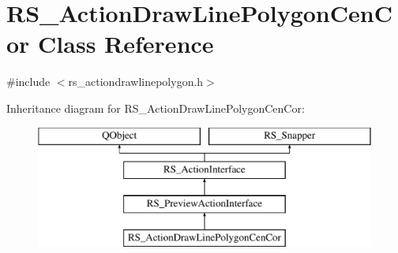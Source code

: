 \hypertarget{classRS__ActionDrawLinePolygonCenCor}{\section{R\-S\-\_\-\-Action\-Draw\-Line\-Polygon\-Cen\-Cor Class Reference}
\label{classRS__ActionDrawLinePolygonCenCor}
}


{\ttfamily \#include $<$rs\-\_\-actiondrawlinepolygon.\-h$>$}

Inheritance diagram for R\-S\-\_\-\-Action\-Draw\-Line\-Polygon\-Cen\-Cor\-:\begin{figure}[H]
\begin{center}
\leavevmode
\includegraphics[height=4.000000cm]{classRS__ActionDrawLinePolygonCenCor}
\end{center}
\end{figure}
